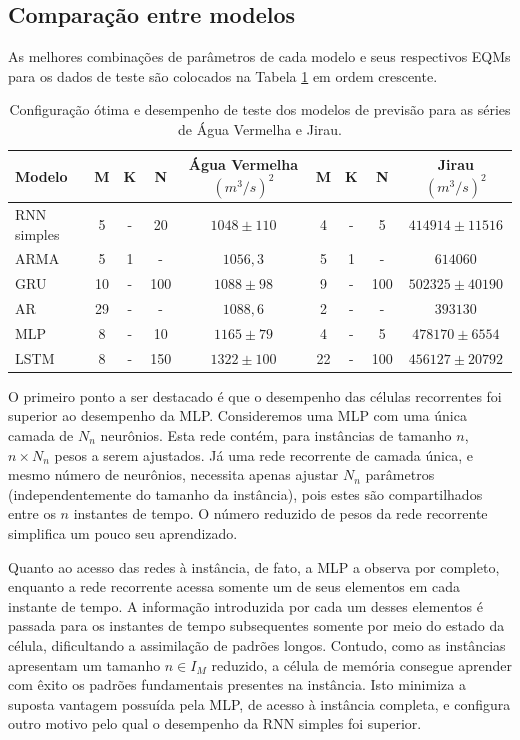 \documentclass[a4paper]{article}
\begin{document}
\begin{multicols}{2}
\subsection{Comparação entre modelos} 
\label{subsec:comparacao_modelos}

As melhores combinações de parâmetros de cada modelo e seus respectivos EQMs para os dados de teste são colocados na Tabela \ref{tab:resultados_finais} em ordem crescente.

\begin{table}[t]
\centering
\caption{Configuração ótima e desempenho de teste dos modelos de previsão para as séries de Água Vermelha e Jirau.}
\label{tab:resultados_finais}
\begin{tabular}{lcccccccc}
\toprule
Modelo & M & K & N & Água Vermelha $(m^3/s)^2$ & M & K & N & Jirau $(m^3/s)^2$ \\
\midrule
RNN simples & 5 & - & 20 & $1048 \pm 110$ & 4 & - & 5 & $414914 \pm 11516$\\
ARMA & 5 & 1 & - & $1056,\!3$ & 5 & 1 & - & $614060$ \\
GRU & 10 & - & 100 & $1088 \pm 98$ & 9 & - & 100 & $502325 \pm 40190$ \\
AR & 29 & - & - & $1088,\!6$ & 2 & - & - & $393130$ \\
MLP & 8 & - & 10 & $1165 \pm 79$ & 4 & - & 5 & $478170 \pm 6554$ \\
LSTM & 8 & - & 150 & $1322 \pm 100$ & 22 & - & 100 & $456127 \pm 20792$ \\
\bottomrule
\end{tabular}
\vspace{-6mm}
\end{table} 

O primeiro ponto a ser destacado é que o desempenho das células recorrentes foi superior ao desempenho da MLP. Consideremos uma MLP com uma única camada de $N_n$ neurônios. Esta rede contém, para instâncias de tamanho $n$, $n \times N_n$  pesos a serem ajustados. Já uma rede recorrente de camada única, e mesmo número de neurônios, necessita apenas ajustar $N_n$ parâmetros (independentemente do tamanho da instância), pois estes são compartilhados entre os $n$ instantes de tempo. O número reduzido de pesos da rede recorrente simplifica um pouco seu aprendizado.

Quanto ao acesso das redes à instância, de fato, a MLP a observa por completo, enquanto a rede recorrente acessa somente um de seus elementos em cada instante de tempo. A informação introduzida por cada um desses elementos é passada para os instantes de tempo subsequentes somente por meio do estado da célula, dificultando a assimilação de padrões longos. Contudo, como as instâncias apresentam um tamanho $n \in I_M$ reduzido, a célula de memória consegue aprender com êxito os padrões fundamentais presentes na instância. Isto minimiza a suposta vantagem possuída pela MLP, de acesso à instância completa, e configura outro motivo pelo qual o desempenho da RNN simples foi superior.


\end{multicols}
\end{document}
